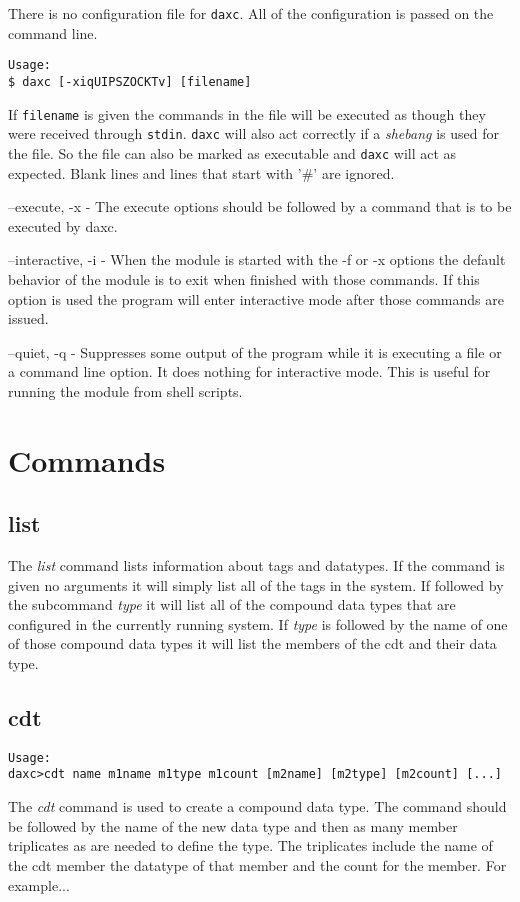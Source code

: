 There is no configuration file for \texttt{daxc}.  All of the configuration is passed on the command line.

\begin{verbatim}
Usage:
$ daxc [-xiqUIPSZOCKTv] [filename]
\end{verbatim}

If \texttt{filename} is given the commands in the file will be executed as though
they were received through \texttt{stdin}.  \texttt{daxc} will also act correctly if a \textit{shebang} is used for the file.  So the file can also be marked as executable and \texttt{daxc} will act as expected.  Blank lines and lines that start with '\#' are ignored.

\begin{list}{}{daxc Command Line Options}
  \item[--execute, -x] - The execute options should be followed by a command that is to be executed by daxc.
  \item[--interactive, -i] - When the module is started with the -f or -x options the default behavior of the module is to exit when finished with those commands.  If this option is used the program will enter interactive mode after those commands are issued.
  \item[--quiet, -q] - Suppresses some output of the program while it is executing a file or a command line option.  It does nothing for interactive mode.  This is useful for running the module from shell scripts. 
\end{list}

\section{Commands}

\subsection{list}
The \textit{list} command lists information about tags and datatypes.  If the command is given no arguments it will simply list all of the tags in the system.  If followed by the subcommand \textit{type} it will list all of the compound data types that are configured in the currently running system.  If \textit{type} is followed by the name of one of those compound data types it will list the members of the cdt and their data type.

\subsection{cdt}
\begin{verbatim}
Usage:
daxc>cdt name m1name m1type m1count [m2name] [m2type] [m2count] [...]
\end{verbatim}
The \textit{cdt} command is used to create a compound data type.  The command should be followed by the name of the new data type and then as many member triplicates as are needed to define the type.  The triplicates include the name of the cdt member the datatype of that member and the count for the member.  For example...


